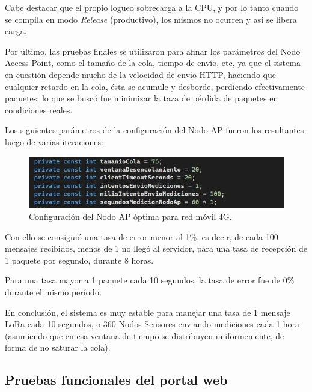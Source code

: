 Cabe destacar que el propio logueo sobrecarga a la CPU, y por lo tanto cuando se compila en modo \textit{Release} (productivo), los mismos no ocurren y así se libera carga.

Por último, las pruebas finales se utilizaron para afinar los parámetros del Nodo Access Point, como el tamaño de la cola, tiempo de envío, etc, ya que el sistema en cuestión depende mucho de la velocidad de envío HTTP, haciendo que cualquier retardo en la cola, ésta se acumule y desborde, perdiendo efectivamente paquetes: lo que se buscó fue minimizar la taza de pérdida de paquetes en condiciones reales.

Los siguientes parámetros de la configuración del Nodo AP fueron los resultantes luego de varias iteraciones:

\begin{figure}[H]
    \centering
    \includegraphics[width=1\linewidth]{Figures//Firmware/configuracion_tuneada.png}
    \caption{Configuración del Nodo AP óptima para red móvil 4G.}
    \label{fig:enter-label}
\end{figure}

Con ello se consiguió una tasa de error menor al 1\%, es decir, de cada 100 mensajes recibidos, menos de 1 no llegó al servidor, para una tasa de recepción de 1 paquete por segundo, durante 8 horas.

Para una tasa mayor a 1 paquete cada 10 segundos, la tasa de error fue de 0\% durante el mismo período.

En conclusión, el sistema es muy estable para manejar una tasa de 1 mensaje LoRa cada 10 segundos, o 360 Nodos Sensores enviando mediciones cada 1 hora (asumiendo que en esa ventana de tiempo se distribuyen uniformemente, de forma de no saturar la cola).

\subsection{Pruebas funcionales del portal web}
\label{sec:pruebasPW}

